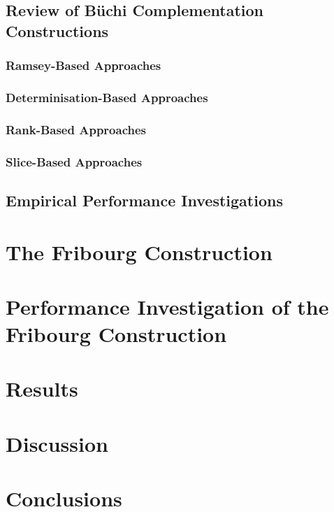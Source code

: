 \documentclass{scrreprt}
\begin{document}
\section{Review of Büchi Complementation Constructions}
\label{review}
\subsection{Ramsey-Based Approaches}
\label{ramsey-based}
\subsection{Determinisation-Based Approaches}
\label{det-based}
\subsection{Rank-Based Approaches}
\label{rank-based}
\subsection{Slice-Based Approaches}
\label{slice-based}

\section{Empirical Performance Investigations}

\chapter{The Fribourg Construction}
\label{fribourg_construction}

\chapter{Performance Investigation of the Fribourg Construction}

\chapter{Results}

\chapter{Discussion}

\chapter{Conclusions}




\end{document}
